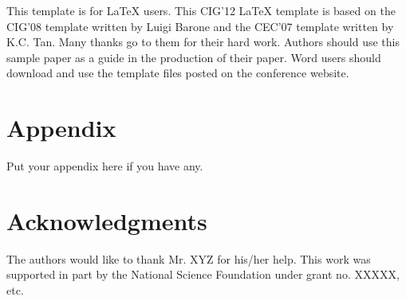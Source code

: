 \documentclass[conference]{IEEEtran}
\begin{document}
This template is for LaTeX users. This CIG'12 LaTeX template is
based on the CIG'08 template written by Luigi Barone and the CEC'07
template written by K.C. Tan. Many thanks go to them for their hard
work. Authors should use this sample paper as a guide in the
production of their paper. Word users should download and use the
template files posted on the conference website.

\section*{Appendix}
Put your appendix here if you have any.

\section*{Acknowledgments}
The authors would like to thank Mr. XYZ for his/her help.
This work was supported in part by the National Science Foundation
under grant no. XXXXX, etc.



%

%




\end{document}

